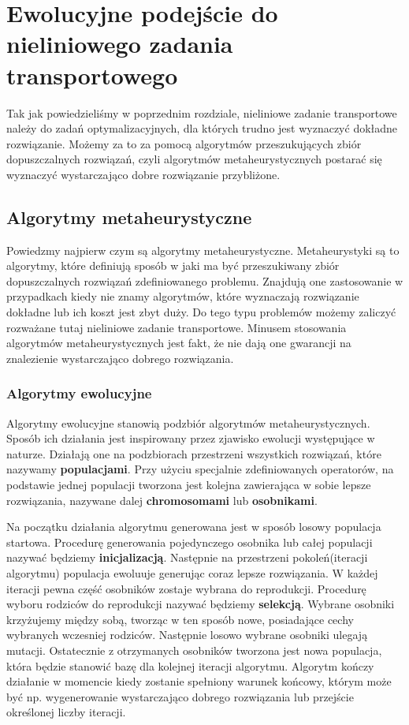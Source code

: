 \chapter{Ewolucyjne podejście do nieliniowego zadania transportowego}
\thispagestyle{chapterBeginStyle}

Tak jak powiedzieliśmy w poprzednim rozdziale, nieliniowe zadanie transportowe należy do zadań optymalizacyjnych, dla których trudno jest 
wyznaczyć dokładne rozwiązanie. Możemy za to za pomocą algorytmów przeszukujących zbiór dopuszczalnych rozwiązań, czyli algorytmów metaheurystycznych 
postarać się wyznaczyć wystarczająco dobre rozwiązanie przybliżone. 

\section{Algorytmy metaheurystyczne}

Powiedzmy najpierw czym są algorytmy metaheurystyczne. Metaheurystyki są to algorytmy, które definiują sposób w jaki ma być przeszukiwany zbiór 
dopuszczalnych rozwiązań zdefiniowanego problemu. Znajdują one zastosowanie w przypadkach kiedy nie znamy algorytmów, które wyznaczają rozwiązanie 
dokładne lub ich koszt jest zbyt duży. Do tego typu problemów możemy zaliczyć rozważane tutaj nieliniowe zadanie transportowe. Minusem 
stosowania algorytmów metaheurystycznych jest fakt, że nie dają one gwarancji na znalezienie wystarczająco dobrego rozwiązania.

\subsection{Algorytmy ewolucyjne}
Algorytmy ewolucyjne stanowią podzbiór algorytmów metaheurystycznych. Sposób ich działania jest inspirowany przez zjawisko ewolucji występujące 
w naturze. Działają one na podzbiorach przestrzeni wszystkich rozwiązań, które nazywamy \textbf{populacjami}. Przy użyciu specjalnie zdefiniowanych 
operatorów, na podstawie jednej populacji tworzona jest kolejna zawierająca w sobie lepsze rozwiązania, nazywane dalej \textbf{chromosomami} 
lub \textbf{osobnikami}.

Na początku działania algorytmu generowana jest w sposób losowy populacja startowa. Procedurę generowania pojedynczego osobnika lub 
całej populacji nazywać będziemy \textbf{inicjalizacją}. Następnie na przestrzeni pokoleń(iteracji algorytmu) 
populacja ewoluuje generując coraz lepsze rozwiązania. W każdej iteracji pewna część osobników zostaje wybrana do reprodukcji. Procedurę wyboru 
rodziców do reprodukcji nazywać będziemy \textbf{selekcją}. Wybrane osobniki krzyżujemy między sobą, tworząc w ten sposób nowe, 
posiadające cechy wybranych wczesniej rodziców. Następnie losowo wybrane osobniki ulegają mutacji. 
Ostatecznie z otrzymanych osobników tworzona jest nowa populacja, która będzie stanowić bazę dla kolejnej iteracji algorytmu. Algorytm kończy 
działanie w momencie kiedy zostanie spełniony warunek końcowy, którym może być np. wygenerowanie wystarczająco dobrego rozwiązania lub 
przejście określonej liczby iteracji.

